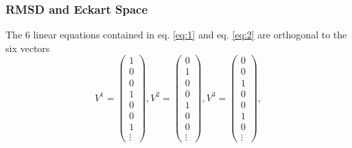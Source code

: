 \documentclass{beamer}
\begin{document}
	\begin{frame}
		\frametitle{RMSD and Eckart Space}
		The 6 linear equations contained in eq. \ref{eq:1} and eq. \ref{eq:2} are orthogonal to the six vectors
		\begin{equation}
		V^1=\begin{pmatrix} 1\\0\\0\\1\\0\\0\\1\\ \vdots\end{pmatrix},
		V^2=\begin{pmatrix} 0\\1\\0\\0\\1\\0\\0\\ \vdots\end{pmatrix},
		V^3=\begin{pmatrix} 0\\0\\1\\0\\0\\1\\0\\ \vdots\end{pmatrix},
		\end{equation}
	\end{frame}
\end{document}
